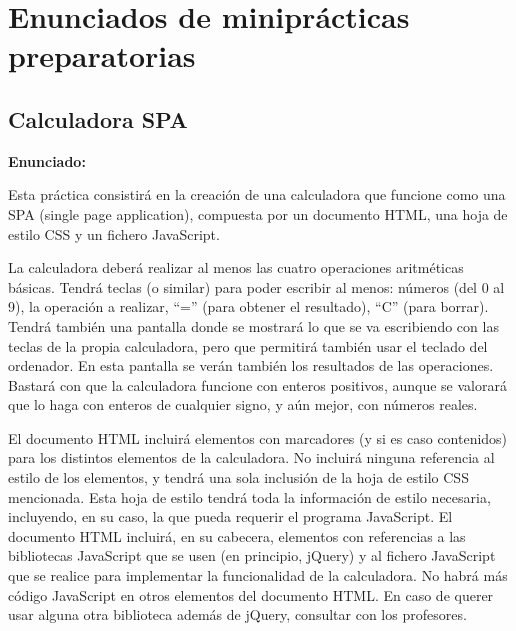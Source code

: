 

\chapter{Enunciados de miniprácticas preparatorias}

\section{Calculadora SPA}
\label{sec:voluntaria-calculadora}

\textbf{Enunciado:}

Esta práctica consistirá en la creación de una calculadora que funcione como una SPA (single page application), compuesta por un documento HTML, una hoja de estilo CSS y un fichero JavaScript.

La calculadora deberá realizar al menos las cuatro operaciones aritméticas básicas. Tendrá teclas (o similar) para poder escribir al menos: números (del 0 al 9), la operación a realizar, ``='' (para obtener el resultado), ``C'' (para borrar). Tendrá también una pantalla donde se mostrará lo que se va escribiendo con las teclas de la propia calculadora, pero que permitirá también usar el teclado del ordenador. En esta pantalla se verán también los resultados de las operaciones. Bastará con que la calculadora funcione con enteros positivos, aunque se valorará que lo haga con enteros de cualquier signo, y aún mejor, con números reales.

El documento HTML incluirá elementos con marcadores (y si es caso contenidos) para los distintos elementos de la calculadora. No incluirá ninguna referencia al estilo de los elementos, y tendrá una sola inclusión de la hoja de estilo CSS mencionada. Esta hoja de estilo tendrá toda la información de estilo necesaria, incluyendo, en su caso, la que pueda requerir el programa JavaScript. El documento HTML incluirá, en su cabecera, elementos con referencias a las bibliotecas JavaScript que se usen (en principio, jQuery) y al fichero JavaScript que se realice para implementar la funcionalidad de la calculadora. No habrá más código JavaScript en otros elementos del documento HTML. En caso de querer usar alguna otra biblioteca además de jQuery, consultar con los profesores.

